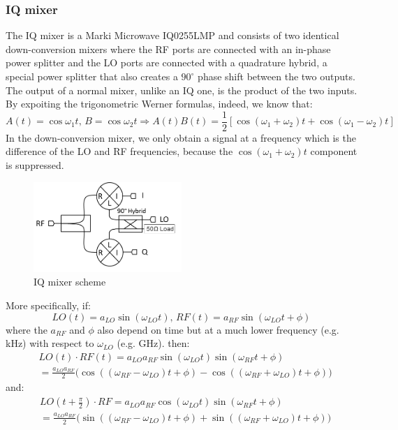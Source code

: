 \documentclass[12pt]{article}
\begin{document}
\subsubsection{IQ mixer}
The IQ mixer is a Marki Microwave IQ0255LMP and consists of two identical down-conversion mixers where the RF ports are connected with an in-phase power splitter and the LO ports are connected with a quadrature hybrid, a special power splitter that also creates a $90^\circ$ phase shift between the two outputs.\\
The output of a normal mixer, unlike an IQ one, is the product of the two inputs. By expoiting the trigonometric Werner formulas, indeed, we know that:
\begin{equation}
A(t) = \cos \omega_1 t, \, B = \cos \omega_2 t \Rightarrow A(t) B(t) = \frac{1}{2} \left[ \cos (\omega_1 + \omega_2) t + \cos (\omega_1 - \omega_2) t\right]
\end{equation}
In the down-conversion mixer, we only obtain a signal at a frequency which is the difference of the LO and RF frequencies, because the $\cos (\omega_1 + \omega_2) t$ component is suppressed.
\begin{figure}[H]
        \centering
        \includegraphics[width=0.5\textwidth]{iqmixer.png}
        \caption{IQ mixer scheme}
        \label{IQmix}
    \end{figure}
More specifically, if:
\begin{equation}
LO(t) = a_{LO}\sin(\omega_{LO}t), \, RF(t) = a_{RF}\sin(\omega_{LO}t + \phi)
\end{equation}
where the $a_{RF}$ and $\phi$ also depend on time but at a much lower frequency (e.g. kHz) with respect to $\omega_{LO}$ (e.g. GHz).
then:
\begin{align}
& LO(t) \cdot RF(t) = a_{LO}a_{RF}\sin(\omega_{LO}t)\sin(\omega_{RF}t + \phi)\\
&= \frac{a_{LO}a_{RF}}{2} \Big( \cos((\omega_{RF}-\omega_{LO})t + \phi) - \cos((\omega_{RF} + \omega_{LO}) t + \phi) \Big)
\end{align}
and:
\begin{align}
& LO(t+\frac{\pi}{2})\cdot RF = a_{LO}a_{RF}\cos(\omega_{LO}t)\sin(\omega_{RF}t + \phi)\\
&= \frac{a_{LO}a_{RF}}{2} \Big( \sin((\omega_{RF}-\omega_{LO})t + \phi) + \sin((\omega_{RF}+\omega_{LO}) t  + \phi) \Big)
\end{align}
\end{document}
